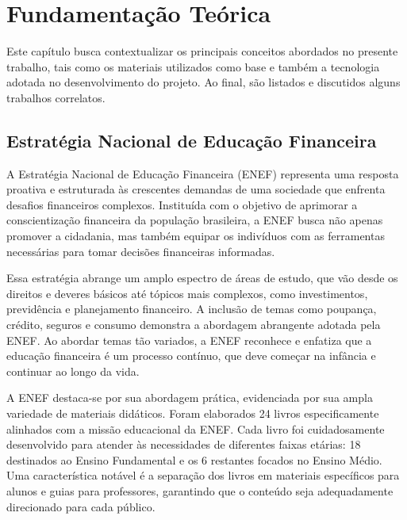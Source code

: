 \chapter{Fundamentação Teórica}
Este capítulo busca contextualizar os principais conceitos abordados no presente trabalho, tais como os materiais utilizados como base e também a tecnologia adotada no desenvolvimento do projeto. Ao final, são listados e discutidos alguns trabalhos correlatos.

\section{Estratégia Nacional de Educação Financeira}


A Estratégia Nacional de Educação Financeira (ENEF) representa uma resposta proativa e estruturada às crescentes demandas de uma sociedade que enfrenta desafios financeiros complexos. Instituída com o objetivo de aprimorar a conscientização financeira da população brasileira, a ENEF busca não apenas promover a cidadania, mas também equipar os indivíduos com as ferramentas necessárias para tomar decisões financeiras informadas.

Essa estratégia abrange um amplo espectro de áreas de estudo, que vão desde os direitos e deveres básicos até tópicos mais complexos, como investimentos, previdência e planejamento financeiro. A inclusão de temas como poupança, crédito, seguros e consumo demonstra a abordagem abrangente adotada pela ENEF. Ao abordar temas tão variados, a ENEF reconhece e enfatiza que a educação financeira é um processo contínuo, que deve começar na infância e continuar ao longo da vida.


A ENEF destaca-se por sua abordagem prática, evidenciada por sua ampla variedade de materiais didáticos. Foram elaborados 24 livros especificamente alinhados com a missão educacional da ENEF. Cada livro foi cuidadosamente desenvolvido para atender às necessidades de diferentes faixas etárias: 18 destinados ao Ensino Fundamental e os 6 restantes focados no Ensino Médio. Uma característica notável é a separação dos livros em materiais específicos para alunos e guias para professores, garantindo que o conteúdo seja adequadamente direcionado para cada público.

